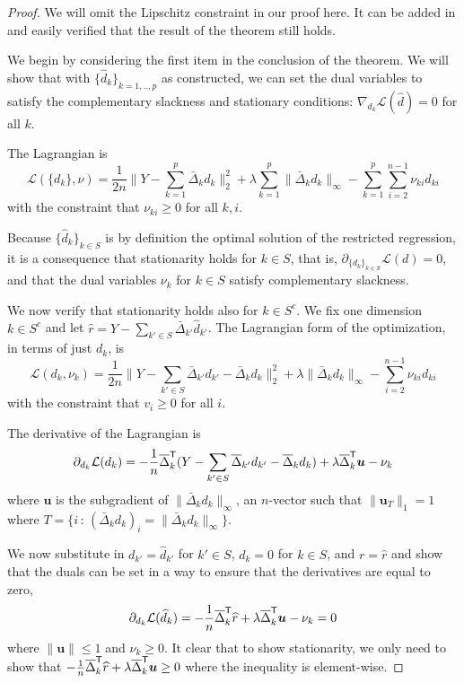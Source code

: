 \begin{proof} 
We will omit the Lipschitz constraint in our proof here. It can be
added in and easily verified that the result of the theorem still holds.

We begin by considering the first item in the conclusion of the theorem.
We will show that with $\{\hat{d}_k\}_{k=1,..,p}$ as constructed, we
can set the dual variables to satisfy the 
complementary slackness and stationary conditions: $\nabla_{d_k} \mathcal{L}(\hat{d})  = 0$ for all $k$. 

The Lagrangian is
\begin{equation}
\label{eqn:full_lagrange}
\mathcal{L}( \{ d_k \}, \nu) = 
  \frac{1}{2n} \Big\| 
    Y - \sum_{k=1}^p  \bar{\Delta}_k d_k  \Big\|_2^2 + 
    \lambda \sum_{k=1}^p \| \bar{\Delta}_k d_k \|_\infty -
    \sum_{k=1}^p \sum_{i=2}^{n-1} \nu_{ki} d_{ki} 
\end{equation}
with the constraint that $\nu_{ki} \geq 0$ for all $k,i$.

Because $\{\hat{d}_k\}_{k \in S}$ is by definition the optimal solution of the restricted regression, it is a consequence that stationarity holds for $k \in S$, that is, $\partial_{ \{ d_k \}_{k \in S} } \mathcal{L}(d) = 0$, and that the dual variables $\nu_k$ for $k \in S$ satisfy complementary slackness.

We now verify that stationarity holds also for $k \in S^c$. We fix one dimension $k \in S^c$ and let $\hat{r} = Y - \sum_{k' \in S} \bar{\Delta}_{k'} \hat{d}_{k'}$. 
The Lagrangian form of the optimization, in terms of just $d_k$, is
\[
\mathcal{L}(d_k, \nu_k) =
  \frac{1}{2n} \big\| Y - \sum_{k' \in S} \bar{\Delta}_{k'} d_{k'} 
  -  \bar{\Delta}_k d_k \big\|_2^2 
   + \lambda \| \bar{\Delta}_k d_k\|_\infty
  - \sum_{i=2}^{n-1} \nu_{ki} d_{ki}
\]
with the constraint that $v_i \geq 0$ for all $i$. 

The derivative of the Lagrangian is
\begin{align*}
\partial_{d_k} \mathcal{L}(d_k) =  -\frac{1}{n} \overline{\Delta}_k^{\mathsf{T}} ( Y - \sum_{k'\in S} \overline{\Delta}_{k'} d_{k'}  - \overline{\Delta}_k d_k )
        + \lambda \overline{\Delta}_k^{\mathsf{T}} \mbox{\boldmath $u$}
      - \nu_k
\end{align*}
where $\mathbf{u}$ is the subgradient of $\| \bar{\Delta}_k d_k \|_\infty$, an $n$-vector such that $\| \mathbf{u}_T \|_1 = 1$ where $T = \{ i \,:\,  (\bar{\Delta}_k d_k)_i = \| \bar{\Delta}_k d_k \|_\infty \}$.

We now substitute in $d_{k'} = \hat{d}_{k'}$ for $k' \in S$, $d_k = 0$ for $k \in S$, and $r = \hat{r}$ and show that the duals can be set in a way to ensure that the derivatives are equal to zero,
\begin{align*}
\partial_{d_k} \mathcal{L}(\widehat{d}_k) = -\frac{1}{n} \overline{\Delta}_k^{\mathsf{T}}\widehat{r} + \lambda \overline{\Delta}_k^{\mathsf{T}} \mbox{\boldmath $u$}
           - \nu_k = 0 
\end{align*}
where $\| \mathbf{u} \| \leq 1$ and $\nu_k \geq 0$. It clear that to show stationarity, we only need to show that $-\frac{1}{n} \overline{\Delta}_k^{\mathsf{T}} \widehat{r} + \lambda \overline{\Delta}_k^{\mathsf{T}} \mbox{\boldmath $u$} \geq 0$ where the inequality is element-wise.


\end{proof}

